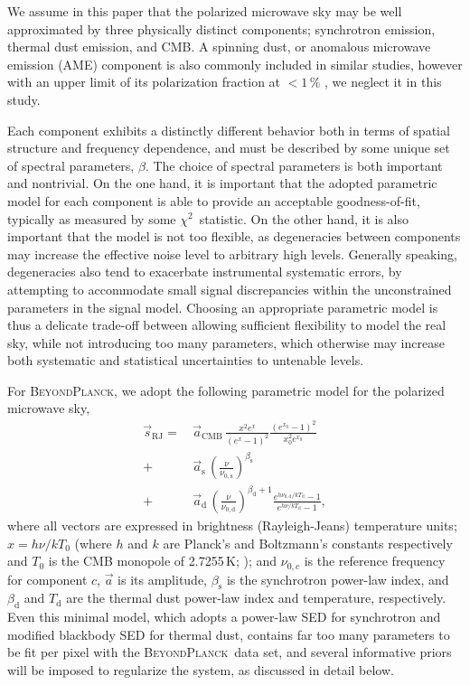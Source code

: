 \documentclass[twocolumn]{aa}
\def\chisq{$\chi^2$}
\newcommand{\s}[0]{\vec{s}}
\renewcommand{\a}[0]{\vec{a}}
\newcommand{\BP}{\textsc{BeyondPlanck}}
\newcommand{\?}[1]{\textcolor{red}{{\bf [#1]}}}
\begin{document}
We assume in this paper that the polarized microwave sky may be well approximated by three
physically distinct components; synchrotron emission, thermal dust emission, and
CMB. A spinning dust, or anomalous microwave emission (AME) component is also
commonly included in similar studies, however with an upper limit of its
polarization fraction at $<$$1\,\%$ \citep{QUIJOTE_II_2016, macellari2011, bp15}, we
neglect it in this study. 

Each component exhibits a distinctly different behavior both in terms
of spatial structure and frequency dependence, and must be described
by some unique set of spectral parameters, $\beta$. The choice of
spectral parameters is both important and nontrivial. On the one hand,
it is important that the adopted parametric model for each component
is able to provide an acceptable goodness-of-fit, typically as
measured by some \chisq\ statistic. On the other hand, it is also
important that the model is not too flexible, as degeneracies between
components may increase the effective noise level to arbitrary high
levels. Generally speaking, degeneracies also tend to exacerbate
instrumental systematic errors, by attempting to accommodate small
signal discrepancies within the unconstrained parameters in the signal
model.  Choosing an appropriate parametric model is thus a delicate
trade-off between allowing sufficient flexibility to model the real
sky, while not introducing too many parameters, which otherwise may
increase both systematic and statistical uncertainties to untenable
levels.

For \BP, we adopt the following parametric model for the polarized
microwave sky, 
\begin{align}
\s_{\mathrm{RJ}} = &\,\a_{\mathrm{CMB}}\,
\frac{x^2e^{x}}{\left(e^{x}-1\right)^2} \frac{\left(e^{x_0}-1\right)^2}{x_0^2e^{x_0}} \,\\
+ &\,\a_{\mathrm{s}}\,
\left(\frac{\nu}{\nu_{0,\mathrm{s}}} \right)^{\beta_{\mathrm{s}}} \, \label{eq:synch}\\
+ &\,\a_{\mathrm{d}}\,\left(\frac{\nu}{\nu_{0,\mathrm{d}}}\right)^{\beta_{\mathrm{d}}+1}
\frac{e^{h\nu_{\mathrm{0,\mathrm{d}}}/kT_{\mathrm{d}}}-1}{e^{h\nu/kT_{\mathrm{d}}}-1}\label{eq:dust},
\end{align}
where all vectors are expressed in brightness (Rayleigh-Jeans) temperature
units; $x=h\nu/kT_0$ (where $h$ and $k$ are Planck's and Boltzmann's constants
respectively and $T_0$ is the CMB monopole of 2.7255\,K; \citealp{fixsen2009}); and $\nu_{0,c}$ is the
reference frequency for component $c$, $\a$ is its amplitude, $\beta_{\mathrm s}$ is the
synchrotron power-law index, and $\beta_{\mathrm d}$ and $T_{\mathrm d}$ are the thermal dust
power-law index and temperature, respectively. Even this minimal model, which adopts a 
power-law SED for synchrotron and modified blackbody SED for thermal dust,
contains far too many parameters to be fit per pixel with the \BP\ data set, and several
informative priors will be imposed to regularize the system, as discussed in
detail below.
\end{document}
